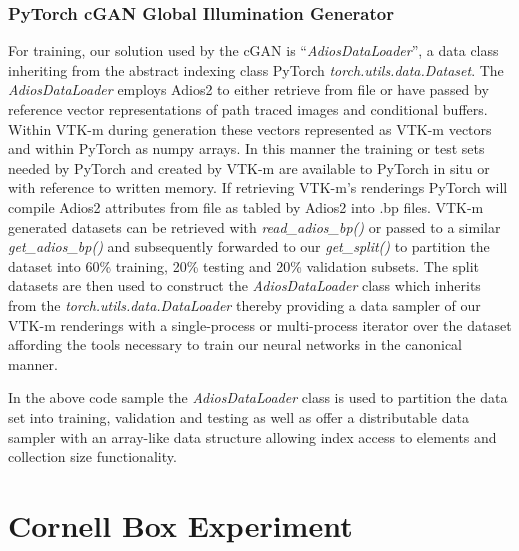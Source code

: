 \documentclass[conference]{IEEEtran}
\begin{document}
\subsubsection{PyTorch cGAN Global Illumination Generator}\label{pytorch}

For training, our solution used by the cGAN is ``{\it AdiosDataLoader}'', a data class inheriting from the abstract indexing class PyTorch {\it torch.utils.data.Dataset}. The {\it AdiosDataLoader} employs Adios2 to either retrieve from file or have passed by reference vector representations of path traced images and conditional buffers. Within VTK-m during generation these vectors represented as VTK-m vectors and within PyTorch as numpy arrays. In this manner the training or test sets needed by PyTorch and created by VTK-m are available to PyTorch in situ or with reference to written memory. If retrieving VTK-m's renderings PyTorch will compile Adios2 attributes from file as tabled by Adios2 into .bp files. VTK-m generated datasets can be retrieved with {\it read\_adios\_bp()} or passed to a similar {\it get\_adios\_bp()} and subsequently forwarded to our {\it get\_split()}  to partition the dataset into 60\% training, 20\% testing and 20\% validation subsets. The split datasets are then used to construct the {\it AdiosDataLoader} class which inherits from the {\it torch.utils.data.DataLoader} thereby providing a data sampler of our VTK-m renderings with a single-process or multi-process iterator over the dataset affording the tools necessary to train our neural networks in the canonical manner.





In the above code sample the {\it AdiosDataLoader} class is used to partition the data set into training, validation and testing as well as offer a distributable data sampler with an array-like data structure allowing index access to elements and collection size functionality.


\section{Cornell Box Experiment}
\end{document}
